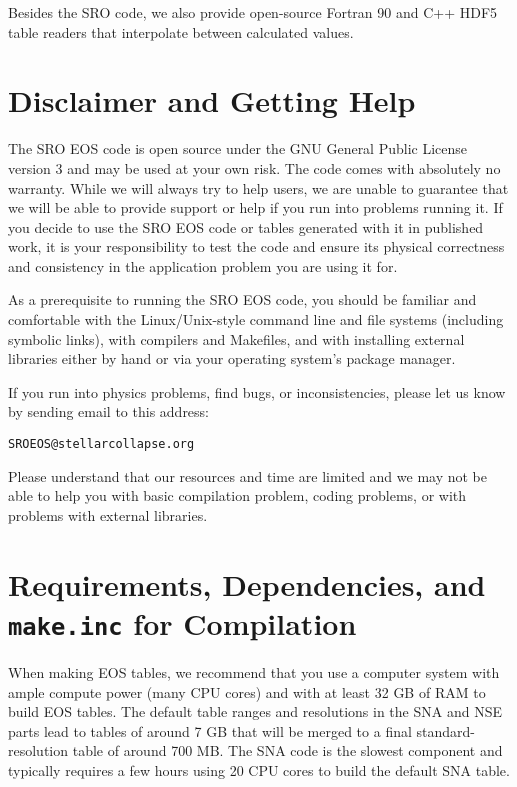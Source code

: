\documentclass[letterpaper,11pt]{refart}
\newcommand{\SRO}{SRO }
\begin{document}
Besides the \SRO code, we also provide open-source Fortran 90 and C++
HDF5 table readers that interpolate between calculated values.

\section{Disclaimer and Getting Help}

\begin{framed}
The SRO EOS code is open source under the GNU General Public License
version 3 and may be used at your own risk. The code comes with
absolutely no warranty. While we will always try to help users, we are
unable to guarantee that we will be able to provide support or help if
you run into problems running it. If you decide to use the SRO EOS
code or tables generated with it in published work, it is your
responsibility to test the code and ensure its physical correctness
and consistency in the application problem you are using it for.
\end{framed}

As a prerequisite to running the SRO EOS code, you should be familiar
and comfortable with the Linux/Unix-style command line and file
systems (including symbolic links), with compilers and Makefiles, and
with installing external libraries either by hand or via your
operating system's package manager.

If you run into physics problems, find bugs, or inconsistencies, please
let us know by sending email to this address:

\begin{center}
\texttt{SROEOS@stellarcollapse.org} 
\end{center}

Please understand that our resources and time are limited and we may
not be able to help you with basic compilation problem, coding
problems, or with problems with external libraries.

\section{Requirements, Dependencies, and \texttt{make.inc} for Compilation}
\label{sec:req}

When making EOS tables, we recommend that you use a computer system
with ample compute power (many CPU cores) and with at least 32 GB of
RAM to build EOS tables. The default table ranges and resolutions in the
SNA and NSE parts lead to tables of around 7 GB that will be merged
to a final standard-resolution table of around 700 MB. The SNA code
is the slowest component and typically requires a few hours using 20 CPU
cores to build the default SNA table.
\end{document}
